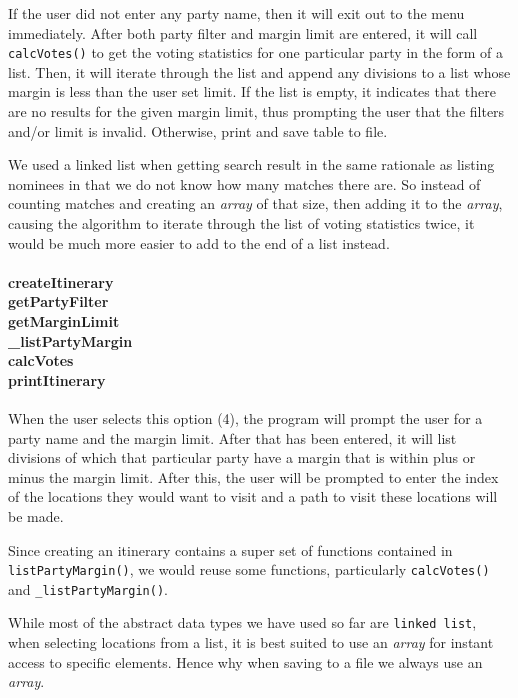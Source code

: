 \documentclass[a4paper, 12pt, titlepage]{article}
\newcommand{\code}[1]{\small\texttt{#1}\normalsize}
\begin{document}
If the user did not enter any party name, then it will exit out to the menu
immediately. After both party filter and margin limit are entered, it will
call \code{calcVotes()} to get the voting statistics for one particular party
in the form of a list. Then, it will iterate through the list and append
any divisions to a list whose margin is less than the user set limit. If
the list is empty, it indicates that there are no results for the given
margin limit, thus prompting the user that the filters and/or limit is
invalid. Otherwise, print and save table to file.

We used a linked list when getting search result in the same rationale as
listing nominees in that we do not know how many matches there are. So instead
of counting matches and creating an \textit{array} of that size, then adding
it to the \textit{array}, causing the algorithm to iterate through the list
of voting statistics twice, it would be much more easier to add to the end
of a list instead.

\paragraph{createItinerary \\
           getPartyFilter \\
           getMarginLimit \\
           \_listPartyMargin \\
           calcVotes \\
           printItinerary
} \hspace{0pt}

When the user selects this option (4), the program will prompt the user
for a party name and the margin limit. After that has been entered, it will
list divisions of which that particular party have a margin that is within
plus or minus the margin limit. After this, the user will be prompted to enter
the index of the locations they would want to visit and a path to visit these
locations will be made.

Since creating an itinerary contains a super set of functions contained in
\code{listPartyMargin()}, we would reuse some functions, particularly
\code{calcVotes()} and \code{\_listPartyMargin()}.

While most of the abstract data types we have used so far are
\code{linked list}, when selecting locations from a list, it is best suited
to use an \textit{array} for instant access to specific elements. Hence why
when saving to a file we always use an \textit{array}.
\end{document}
